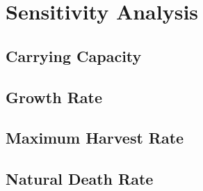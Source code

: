 \section{Sensitivity Analysis}
\subsection{Carrying Capacity}
\subsection{Growth Rate}
\subsection{Maximum Harvest Rate}
\subsection{Natural Death Rate}
